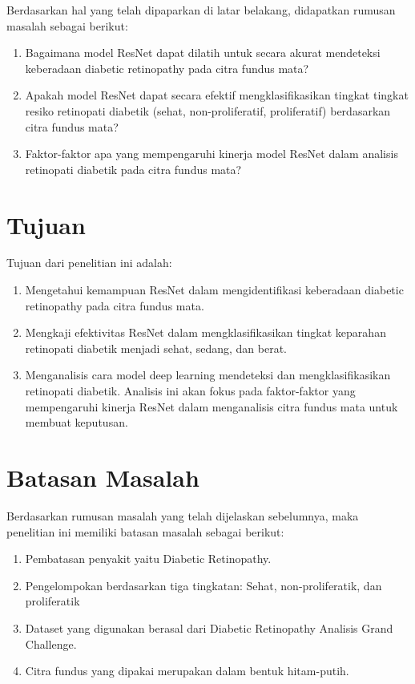 Berdasarkan hal yang telah dipaparkan di latar belakang, didapatkan rumusan masalah sebagai berikut:
\begin{enumerate}
    \item Bagaimana model ResNet dapat dilatih untuk secara akurat mendeteksi keberadaan diabetic retinopathy pada citra fundus mata?
    \item Apakah model ResNet dapat secara efektif mengklasifikasikan tingkat tingkat resiko retinopati diabetik (sehat, non-proliferatif, proliferatif) berdasarkan citra fundus mata?
    \item Faktor-faktor apa yang mempengaruhi kinerja model ResNet dalam analisis retinopati diabetik pada citra fundus mata?
\end{enumerate}


\section{Tujuan}

Tujuan dari penelitian ini adalah:
\begin{enumerate}
    \item Mengetahui kemampuan ResNet dalam mengidentifikasi keberadaan diabetic retinopathy pada citra fundus mata.
    \item Mengkaji efektivitas ResNet dalam mengklasifikasikan tingkat keparahan retinopati diabetik menjadi sehat, sedang, dan berat.
    \item Menganalisis cara model deep learning mendeteksi dan mengklasifikasikan retinopati diabetik. Analisis ini akan fokus pada faktor-faktor yang mempengaruhi kinerja ResNet dalam menganalisis citra fundus mata untuk membuat keputusan.
\end{enumerate}

\section{Batasan Masalah}

Berdasarkan rumusan masalah yang telah dijelaskan sebelumnya, maka penelitian ini memiliki batasan masalah sebagai berikut:
\begin{enumerate}
    \item Pembatasan penyakit yaitu Diabetic Retinopathy.
    \item Pengelompokan berdasarkan tiga tingkatan: Sehat, non-proliferatik, dan proliferatik
    \item Dataset yang digunakan berasal dari Diabetic Retinopathy Analisis Grand Challenge.
    \item Citra fundus yang dipakai merupakan dalam bentuk hitam-putih.
\end{enumerate}


